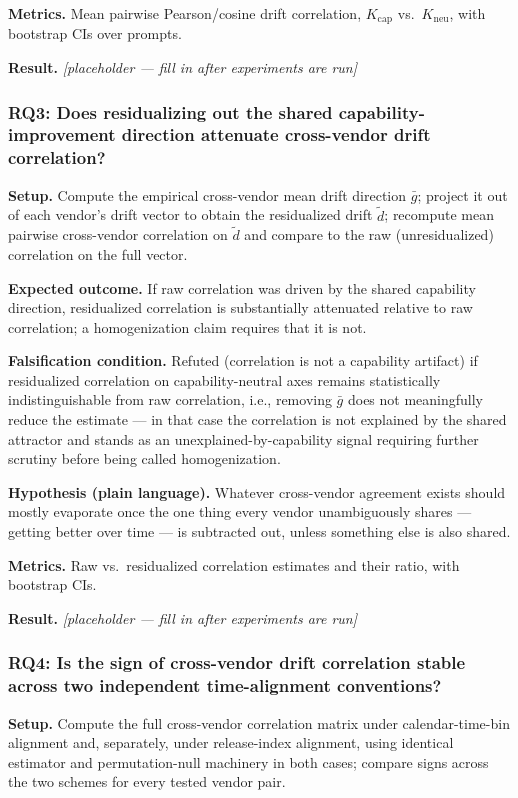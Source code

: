 \documentclass[11pt]{article}
\newcommand{\ph}{\textit{[placeholder --- fill in after experiments are run]}}
\begin{document}
\textbf{Metrics.} Mean pairwise Pearson/cosine drift correlation, $K_{\text{cap}}$ vs.\ $K_{\text{neu}}$, with bootstrap CIs over prompts.

\textbf{Result.} \ph

\subsubsection{RQ3: Does residualizing out the shared capability-improvement direction attenuate cross-vendor drift correlation?}
\textbf{Setup.} Compute the empirical cross-vendor mean drift direction $\bar{g}$; project it out of each vendor's drift vector to obtain the residualized drift $\tilde{d}$; recompute mean pairwise cross-vendor correlation on $\tilde{d}$ and compare to the raw (unresidualized) correlation on the full vector.

\textbf{Expected outcome.} If raw correlation was driven by the shared capability direction, residualized correlation is substantially attenuated relative to raw correlation; a homogenization claim requires that it is not.

\textbf{Falsification condition.} Refuted (correlation is not a capability artifact) if residualized correlation on capability-neutral axes remains statistically indistinguishable from raw correlation, i.e., removing $\bar{g}$ does not meaningfully reduce the estimate --- in that case the correlation is not explained by the shared attractor and stands as an unexplained-by-capability signal requiring further scrutiny before being called homogenization.

\textbf{Hypothesis (plain language).} Whatever cross-vendor agreement exists should mostly evaporate once the one thing every vendor unambiguously shares --- getting better over time --- is subtracted out, unless something else is also shared.

\textbf{Metrics.} Raw vs.\ residualized correlation estimates and their ratio, with bootstrap CIs.

\textbf{Result.} \ph

\subsubsection{RQ4: Is the sign of cross-vendor drift correlation stable across two independent time-alignment conventions?}
\textbf{Setup.} Compute the full cross-vendor correlation matrix under calendar-time-bin alignment and, separately, under release-index alignment, using identical estimator and permutation-null machinery in both cases; compare signs across the two schemes for every tested vendor pair.
\end{document}
